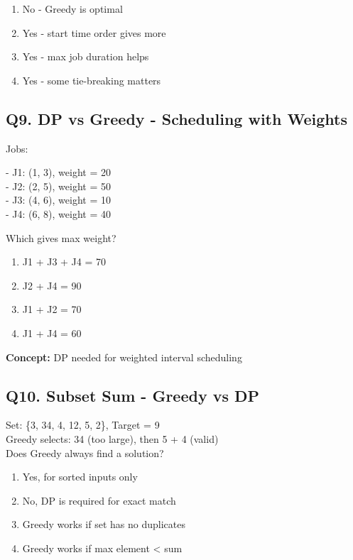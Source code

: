 \begin{enumerate}[label=(\alph*)]
    \item No - Greedy is optimal
    \item Yes - start time order gives more 
    \item Yes - max job duration helps 
    \item Yes - some tie-breaking matters
\end{enumerate}



\subsection*{Q9. DP vs Greedy - Scheduling with Weights}
Jobs:
\begin{center}
- J1: (1, 3), weight = 20\\
- J2: (2, 5), weight = 50\\ 
- J3: (4, 6), weight = 10\\
- J4: (6, 8), weight = 40\\
\end{center}
Which gives max weight?

\begin{enumerate}[label=(\alph*)]
    \item J1 + J3 + J4 = 70 
    \item J2 + J4 = 90 
    \item J1 + J2 = 70 
    \item J1 + J4 = 60
\end{enumerate}

\textbf{Concept:} DP needed for weighted interval scheduling


\subsection*{Q10. Subset Sum - Greedy vs DP}
Set: \{3, 34, 4, 12, 5, 2\}, Target = 9\\
Greedy selects: 34 (too large), then 5 + 4 (valid)\\
Does Greedy always find a solution?

\begin{enumerate}[label=(\alph*)]
    \item Yes, for sorted inputs only 
    \item No, DP is required for exact match 
    \item Greedy works if set has no duplicates 
    \item Greedy works if max element < sum
\end{enumerate}
